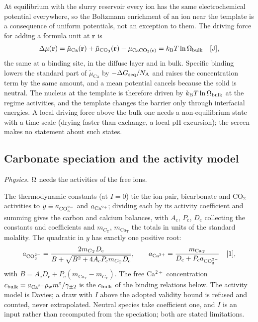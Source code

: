 At equilibrium with the slurry reservoir every ion has the same electrochemical potential everywhere, so
the Boltzmann enrichment of an ion near the template is a consequence of uniform potentials, not an
exception to them. The driving force for adding a formula unit at $\mathbf r$ is
\begin{equation}\label{thsi:eq:dmu-uniform}
\Delta\mu(\mathbf r)=\tilde\mu_\mathrm{Ca}(\mathbf r)+\tilde\mu_{\mathrm{CO_3}}(\mathbf r)-\mu_\mathrm{CaCO_3(s)}=k_\mathrm{B} T\ln\Omega_\mathrm{bulk} \quad[\mathrm{J}],
\end{equation}
the same at a binding site, in the diffuse layer and in bulk. Specific binding lowers the standard part
of $\tilde\mu_\mathrm{Ca}$ by $-\Delta G_\mathrm{seq}/N_\mathrm{A}$ and raises the concentration term by the same amount, and a
mean potential cancels because the solid is neutral. The nucleus at the template is therefore driven by
$k_\mathrm{B} T\ln\Omega_\mathrm{bulk}$ at the regime activities, and the template changes the barrier only through interfacial
energies. A local driving force above the bulk one needs a non-equilibrium state with a time scale
(drying faster than exchange, a local pH excursion); the screen makes no statement about such states.

\subsection{Carbonate speciation and the activity model}\label{thsi:sec:speciation}

\textit{Physics.} $\Omega$ needs the activities of the free ions.

The thermodynamic constants (at $I=0$) tie the ion-pair, bicarbonate and CO$_2$ activities to
$y\equiv a_{\mathrm{CO}_3^{2-}}$ and $a_{\mathrm{Ca}^{2+}}$; dividing each by its activity coefficient and summing gives the carbon and
calcium balances, with $A_\mathrm{c}$, $P_\mathrm{c}$, $D_\mathrm{c}$ collecting the constants and
coefficients and $m_{C_\mathrm{T}}$, $m_{\mathrm{Ca}_\mathrm{T}}$ the totals in units of the standard
molality. The quadratic in $y$ has exactly one positive root:
\begin{equation}\label{thsi:eq:aco3}
a_{\mathrm{CO}_3^{2-}}=\frac{2m_{C_\mathrm{T}}D_\mathrm{c}}{B+\sqrt{B^{2}+4A_\mathrm{c}P_\mathrm{c}m_{C_\mathrm{T}}D_\mathrm{c}}},\qquad
a_{\mathrm{Ca}^{2+}}=\frac{m_{\mathrm{Ca}_\mathrm{T}}}{D_\mathrm{c}+P_\mathrm{c}a_{\mathrm{CO}_3^{2-}}} \quad[\mathrm{1}],
\end{equation}
with $B=A_\mathrm{c}D_\mathrm{c}+P_\mathrm{c}(m_{\mathrm{Ca}_\mathrm{T}}-m_{C_\mathrm{T}})$. The free Ca$^{2+}$
concentration $c_\mathrm{bulk}=a_{\mathrm{Ca}^{2+}}\rho_\mathrm{w}m^{\circ}/\gamma_{\pm2}$ is the $c_\mathrm{bulk}$ of the binding relations below.
The activity model is Davies; a draw with $I$ above the adopted validity bound is refused and counted,
never extrapolated. Neutral species take coefficient one, and $I$ is an input rather than recomputed from
the speciation; both are stated limitations.

